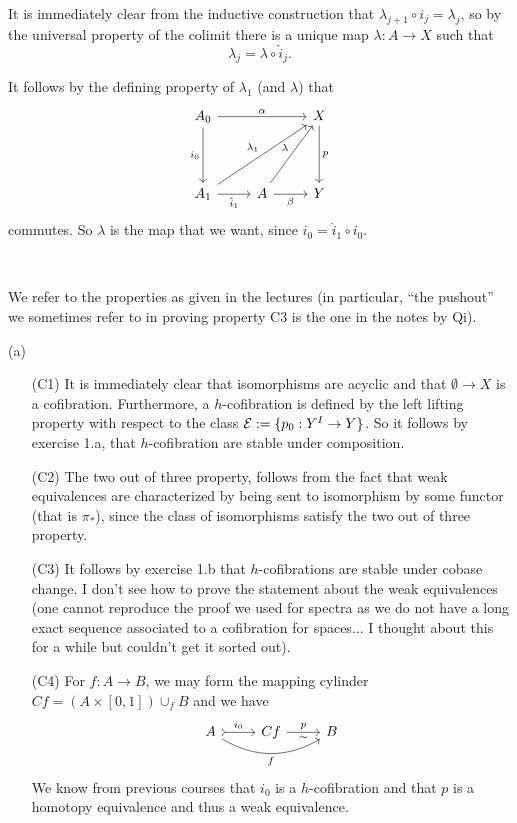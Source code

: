 \begin{exercise}[1]
It is immediately clear from the inductive construction that $\lambda_{j+1}
\circ i_j=\lambda_j$, so by the universal property of the colimit there is a unique map $\lambda:A\to X$ such that
\[\lambda_j=\lambda\circ\hat i_j.\]

It follows by the defining property of $\lambda_1$ (and $\lambda$) that 
\[ \begin{tikzcd}[row sep = 4em]
A_0 \ar[rr,"\alpha"] \ar[d, "i_0"'] &
& X \ar[d, "p"] \\
A_1 \ar[r, "\hat i_1"'] \ar[rru, "\lambda_1"]
& A \ar[r, "\beta"'] \ar[ru, "\lambda"]
& Y
\end{tikzcd} \]
commutes. So $\lambda$ is the map that we want, since $\hat i_0 = \hat i_1
\circ i_0$.
\end{exercise}


\begin{exercise}[2]\ 

We refer to the properties as given in the lectures (in particular, ``the pushout'' we sometimes refer to in proving property C3 is the one in the notes by Qi).

(a)
\begin{enumerate}
\item[(C1)] 
It is immediately clear that isomorphisms are acyclic and that $\emptyset \to X$
is a cofibration. Furthermore, a $h$-cofibration is defined by the left lifting
property with respect to the class $\mathcal{E} := \{ p_0 : Y^I \to Y \}$. So it
follows by exercise 1.a, that $h$-cofibration are stable under composition.

\item[(C2)]
The two out of three property, follows from the fact that weak equivalences are
characterized by being sent to isomorphism by some functor (that is $\pi_*$),
since the class of isomorphisms satisfy the two out of three property.

\item[(C3)]
It follows by exercise 1.b that $h$-cofibrations are stable under cobase change. I don't see how to prove the statement about the weak equivalences (one cannot reproduce the proof we used for spectra as we do not have a long exact sequence associated to a cofibration for spaces... I thought about this for a while but couldn't get it sorted out).

\item[(C4)]
For $f: A \to B$, we may form the mapping cylinder $Cf = (A \times [0,1]) \cup_f
B$ and we have 
\[ \begin{tikzcd}
A \ar[r, tail, "i_0"] \ar[rr, bend right, "f"']
& Cf \ar[r, "p", "\sim"'] 
& B 
\end{tikzcd} \]
We know from previous courses that $i_0$ is a $h$-cofibration and that $p$ is
a homotopy equivalence and thus a weak equivalence.
\end{enumerate}


\end{exercise}
